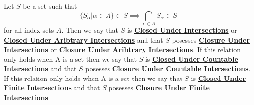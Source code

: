 \newcommand{\ClosureUnderFiniteIntersections}[0]{\textbf{\hyperref[def:ClosureUnderIntersection]{Closure Under Finite Intersections}}\xspace}
\newcommand{\ClosureUnderCountableIntersections}[0]{\textbf{\hyperref[def:ClosureUnderIntersection]{Closure Under Countable Intersections}}\xspace}
\newcommand{\ClosureUnderIntersections}[0]{\textbf{\hyperref[def:ClosureUnderIntersection]{Closure Under Intersections}}\xspace}
\newcommand{\ClosureUnderArbitraryIntersections}[0]{\textbf{\hyperref[def:ClosureUnderIntersection]{Closure Under Aribtrary Intersections}}\xspace}
\newcommand{\ClosedUnderFiniteIntersections}[0]{\textbf{\hyperref[def:ClosureUnderIntersection]{Closed Under Finite Intersections}}\xspace}
\newcommand{\ClosedUnderCountableIntersections}[0]{\textbf{\hyperref[def:ClosureUnderIntersection]{Closed Under Countable Intersections}}\xspace}
\newcommand{\ClosedUnderIntersections}[0]{\textbf{\hyperref[def:ClosureUnderIntersection]{Closed Under Intersections}}\xspace}
\newcommand{\ClosedUnderArbitraryIntersections}[0]{\textbf{\hyperref[def:ClosureUnderIntersection]{Closed Under Aribtrary Intersections}}\xspace}
\begin{df}
\label{def:ClosureUnderIntersection}
\rm
    Let $S$ be a set such that 
    \begin{equation*}
    \{ S_\alpha | \alpha \in A\} \subset S \implies \bigcap_{\alpha \in A} S_{\alpha}   \in S
    \end{equation*}
    for all index sets $A$. 
    Then we say that $S$ is 
    \ClosedUnderIntersections
    or
    \ClosedUnderArbitraryIntersections
    and that $S$ posesses 
    \ClosureUnderIntersections
    or
    \ClosureUnderArbitraryIntersections.
    If this relation only holds when A is a 
    \Countable set then we say that 
    $S$ is 
    \ClosedUnderCountableIntersections
    and that $S$ posesses
    \ClosureUnderCountableIntersections. 
    If this relation only holds when A is a 
    \Finite set then we say that 
    $S$ is 
    \ClosedUnderFiniteIntersections
    and that $S$ posesses
    \ClosureUnderFiniteIntersections    
\end{df}
